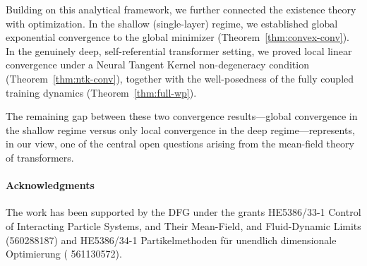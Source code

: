 \documentclass[11pt,a4wide]{article}
\theoremstyle{definition}
\begin{document}
Building on this analytical framework, we further connected the existence theory with optimization. In the shallow (single-layer) regime, we established global exponential convergence to the global minimizer (Theorem~\ref{thm:convex-conv}). In the genuinely deep, self-referential transformer setting, we proved local linear convergence under a Neural Tangent Kernel non-degeneracy condition (Theorem~\ref{thm:ntk-conv}), together with the well-posedness of the fully coupled training dynamics (Theorem~\ref{thm:full-wp}).

The remaining gap between these two convergence results—global convergence in the shallow regime versus only local convergence in the deep regime—represents, in our view, one of the central open questions arising from the mean-field theory of transformers.


\paragraph{Acknowledgments}
The work has been supported by the DFG under the grants HE5386/33-1 Control of Interacting Particle Systems, and Their Mean-Field, and Fluid-Dynamic Limits (560288187) and  HE5386/34-1 Partikelmethoden für unendlich dimensionale Optimierung ( 561130572). 
\end{document}
